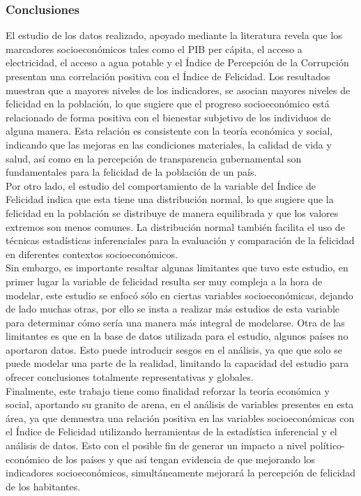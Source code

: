 \subsubsection{Conclusiones}
El estudio de los datos realizado, apoyado mediante la literatura revela que los marcadores socioeconómicos tales como el PIB per cápita, el acceso a electricidad, el acceso a agua potable y el Índice de Percepción de la Corrupción presentan una correlación positiva con el Índice de Felicidad. Los resultados muestran que a mayores niveles de los indicadores, se asocian mayores niveles de felicidad en la población, lo que sugiere que el progreso socioeconómico está relacionado de forma positiva con el bienestar subjetivo de los individuos de alguna manera. Esta relación es consistente con la teoría económica y social, indicando que las mejoras en las condiciones materiales, la calidad de vida y salud, así como en la percepción de transparencia gubernamental son fundamentales para la felicidad de la población de un país. \\

Por otro lado, el estudio del comportamiento de la variable del Índice de Felicidad indica que esta tiene una distribución normal, lo que sugiere que la felicidad en la población se distribuye de manera equilibrada y que los valores extremos son menos comunes. La distribución normal también facilita el uso de técnicas estadísticas inferenciales para la evaluación y comparación de la felicidad en diferentes contextos socioeconómicos. \\

Sin embargo, es importante resaltar algunas limitantes que tuvo este estudio, en primer lugar la variable de felicidad resulta ser muy compleja a la hora de modelar, este estudio se enfocó sólo en ciertas variables socioeconómicas, dejando de lado muchas otras, por ello se insta a realizar más estudios de esta variable para determinar cómo sería una manera más integral de modelarse. Otra de las limitantes es que en la base de datos utilizada para el estudio, algunos países no aportaron datos. Esto puede introducir sesgos en el análisis, ya que que solo se puede modelar una parte de la realidad, limitando la capacidad del estudio para ofrecer conclusiones totalmente representativas y globales. \\

Finalmente, este trabajo tiene como finalidad reforzar la teoría económica y social, aportando su granito de arena, en el análisis de variables presentes en esta área, ya que demuestra una relación positiva en las variables socioeconómicas con el Índice de Felicidad utilizando herramientas de la estadística inferencial y el análisis de datos. Esto con el posible fin de generar un impacto a nivel político-económico de los países y que así tengan evidencia de que mejorando los indicadores socioeconómicos, simultáneamente mejorará la percepción de felicidad de los habitantes.  


